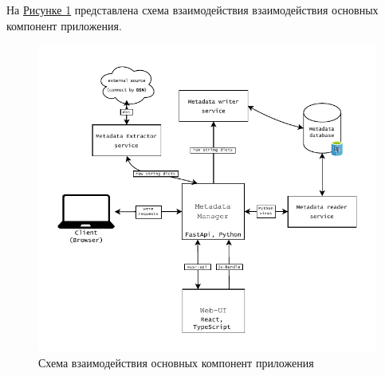 На \hyperref[fig:app-schema]{Рисунке \ref*{fig:app-schema}} представлена схема взаимодействия взаимодействия основных компонент приложения. 
\begin{figure}[h!]
	\centering
	\includegraphics[width=.9\linewidth]{app-schema.drawio.pdf}
	\caption{Схема взаимодействия основных компонент приложения}
	\label{fig:app-schema}
\end{figure}

